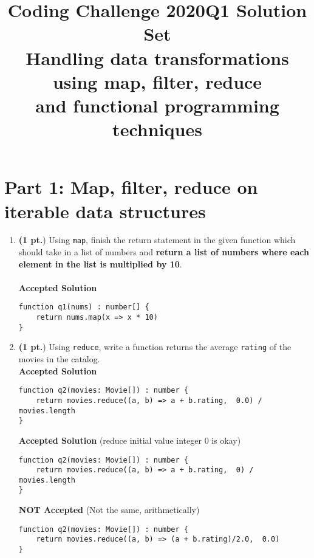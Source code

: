 \documentclass[12pt]{article}
\title{  Coding Challenge 2020Q1 Solution Set \\
  \large Handling data transformations using map, filter, reduce \\
    and functional programming techniques }
\date{}
\begin{document}
  \maketitle

  \vspace{-0.3in}
  \noindent
\setcounter{secnumdepth}{0} %


\newpage
\section{Part 1: Map, filter, reduce on iterable data structures}

  \begin{enumerate}

    \item \textbf{(1 pt.}) Using \texttt{map}, finish the return statement in the given function which should take in a list of numbers and \textbf{return a list of numbers where each element in the list is multiplied by 10}.
    \\ \\ \noindent
\textbf{Accepted Solution}
\begin{lstlisting}[style=JavaScript]
function q1(nums) : number[] {
    return nums.map(x => x * 10)
}
\end{lstlisting}



\newpage
    \item \textbf{(1 pt.}) Using \texttt{reduce}, write a function returns the average \texttt{rating} of the movies in the catalog. \\
    
\textbf{Accepted Solution}
\begin{lstlisting}[style=JavaScript]
function q2(movies: Movie[]) : number {
    return movies.reduce((a, b) => a + b.rating,  0.0) / movies.length
}
\end{lstlisting}

\textbf{Accepted Solution} (reduce initial value integer 0 is okay)
\begin{lstlisting}[style=JavaScript]
function q2(movies: Movie[]) : number {
    return movies.reduce((a, b) => a + b.rating,  0) / movies.length
}
\end{lstlisting}

\textbf{NOT Accepted} (Not the same, arithmetically)
\begin{lstlisting}[style=JavaScript]
function q2(movies: Movie[]) : number {
    return movies.reduce((a, b) => (a + b.rating)/2.0,  0.0)
}
\end{lstlisting}



\end{enumerate}
\end{document}

